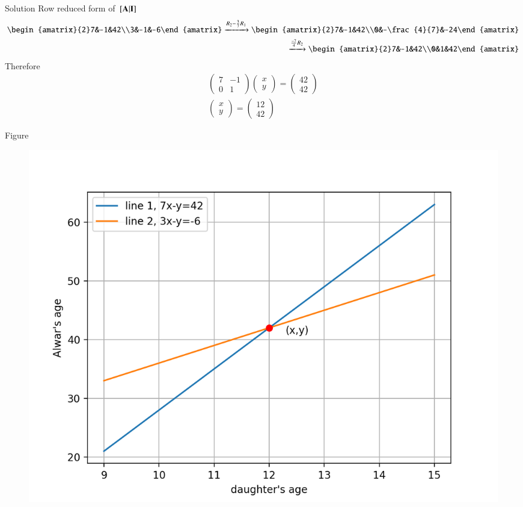 \documentclass{beamer}
\begin{document}
\begin{frame}{Solution}
Row reduced form of ${}\left[\mathbf{A}\vert \mathbf{I}\right]$
\begin{align}
    \begin{amatrix}{2}7&-1&42\\3&-1&-6\end{amatrix}\xrightarrow[]{R_2-\frac{3}{7}R_1}\begin{amatrix}{2}7&-1&42\\0&-\frac{4}{7}&-24\end{amatrix}\\
    \xrightarrow[]{\frac{-7}{4}R_2}\begin{amatrix}{2}7&-1&42\\0&1&42\end{amatrix}
\end{align}
Therefore
\begin{align}
    \begin{pmatrix}7&-1\\0&1\end{pmatrix}\begin{pmatrix}x\\y\end{pmatrix}=\begin{pmatrix}42\\42\end{pmatrix}\\
    \begin{pmatrix}x\\y\end{pmatrix}=\begin{pmatrix}12\\42\end{pmatrix}
\end{align}
\end{frame}
\begin{frame}{Figure}
\begin{figure}[H]
    \centering
    \includegraphics[width=0.6\columnwidth]{figs/figure.png}
    \caption{}
    \label{fig:placeholder}
\end{figure}
\end{frame}
\end{document}
